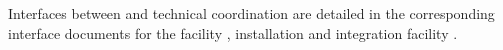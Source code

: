 Interfaces between  and technical coordination are detailed in the corresponding interface documents for the facility \cite{bib:docdb6991}, installation \cite{bib:docdb7018}
and integration facility \cite{bib:docdb7045}.

















